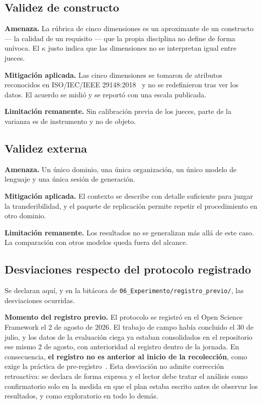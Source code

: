 \documentclass[11pt,a4paper]{article}
\begin{document}
\subsection{Validez de constructo}

\textbf{Amenaza.} La r\'ubrica de cinco dimensiones es un aproximante de un constructo
--- la calidad de un requisito --- que la propia disciplina no define de forma
un\'ivoca. El $\kappa$ justo indica que las dimensiones no se interpretan igual entre
jueces.

\textbf{Mitigaci\'on aplicada.} Las cinco dimensiones se tomaron de atributos
reconocidos en ISO/\allowbreak IEC/\allowbreak IEEE 29148:2018~\cite{iso29148_2018} y no se redefinieron tras
ver los datos. El acuerdo se midi\'o y se report\'o con una escala publicada.

\textbf{Limitaci\'on remanente.} Sin calibraci\'on previa de los jueces, parte de la
varianza es de instrumento y no de objeto.

\subsection{Validez externa}

\textbf{Amenaza.} Un \'unico dominio, una \'unica organizaci\'on, un \'unico modelo de
lenguaje y una \'unica sesi\'on de generaci\'on.

\textbf{Mitigaci\'on aplicada.} El contexto se describe con detalle suficiente para
juzgar la transferibilidad, y el paquete de replicaci\'on permite repetir el
procedimiento en otro dominio.

\textbf{Limitaci\'on remanente.} Los resultados no se generalizan m\'as all\'a de este
caso. La comparaci\'on con otros modelos queda fuera del alcance.

\subsection{Desviaciones respecto del protocolo registrado}

Se declaran aqu\'i, y en la bit\'acora de
\texttt{06\_Experimento/registro\_previo/}, las desviaciones ocurridas.

\textbf{Momento del registro previo.} El protocolo se registr\'o en el Open Science
Framework el 2 de agosto de 2026. El trabajo de campo hab\'ia concluido el 30 de julio,
y los datos de la evaluaci\'on ciega ya estaban consolidados en el repositorio ese mismo
2 de agosto, con anterioridad al registro dentro de la jornada. En consecuencia,
\textbf{el registro no es anterior al inicio de la recolecci\'on}, como exige la
pr\'actica de pre-registro~\cite{nosek2018preregistration}. Esta desviaci\'on no admite
correcci\'on retroactiva: se declara de forma expresa y el lector debe tratar el
an\'alisis como confirmatorio solo en la medida en que el plan estaba escrito antes de
observar los resultados, y como exploratorio en todo lo dem\'as.
\end{document}
